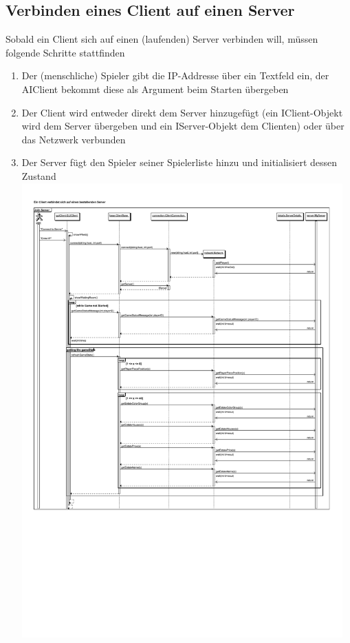 \documentclass[a4paper,10pt]{article}
\begin{document}
\subsection{Verbinden eines Client auf einen Server}
Sobald ein Client sich auf einen (laufenden) Server verbinden will, müssen folgende Schritte stattfinden
\begin{enumerate}
\item Der (menschliche) Spieler gibt die IP-Addresse über ein Textfeld ein, der AIClient bekommt diese als Argument beim Starten übergeben
\item Der Client wird entweder direkt dem Server hinzugefügt (ein IClient-Objekt wird dem Server übergeben und ein IServer-Objekt dem Clienten) oder über das Netzwerk verbunden
\item Der Server fügt den Spieler seiner Spielerliste hinzu und initialisiert dessen Zustand
\includegraphics[width=0.97\textwidth]{client_verbinden} 
\end{enumerate}
\end{document}
